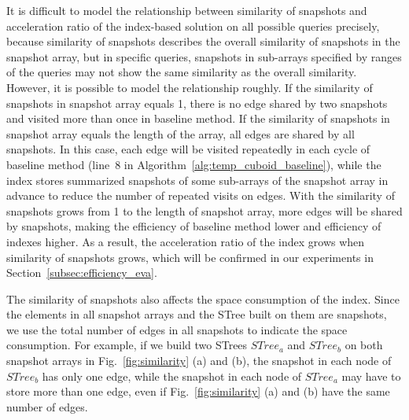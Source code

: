 \documentclass[10pt,journal,compsoc]{IEEEtran}
\begin{document}
It is difficult to model the relationship between similarity of snapshots and acceleration ratio of the index-based solution on all possible queries precisely, because similarity of snapshots describes the overall similarity of snapshots in the snapshot array, but in specific queries, snapshots in sub-arrays specified by ranges of the queries may not show the same similarity as the overall similarity. However, it is possible to model the relationship roughly. If the similarity of snapshots in snapshot array equals 1, there is no edge shared by two snapshots and visited more than once in baseline method. If the similarity of snapshots in snapshot array equals the length of the array, all edges are shared by all snapshots. In this case, each edge will be visited repeatedly in each cycle of baseline method (line~8 in Algorithm~\ref{alg:temp_cuboid_baseline}), while the index stores summarized snapshots of some sub-arrays of the snapshot array in advance to reduce the number of repeated visits on edges. With the similarity of snapshots grows from 1 to the length of snapshot array, more edges will be shared by snapshots, making the efficiency of baseline method lower and efficiency of indexes higher. As a result, the acceleration ratio of the index grows when similarity of snapshots grows, which will be confirmed in our experiments in Section~\ref{subsec:efficiency_eva}.

The similarity of snapshots also affects the space consumption of the index. Since the elements in all snapshot arrays and the STree built on them are snapshots, we use the total number of edges in all snapshots to indicate the space consumption. For example, if we build two STrees $ STree_a $ and $ STree_b $ on both snapshot arrays in Fig.~\ref{fig:similarity} (a) and (b), the snapshot in each node of $ STree_b $ has only one edge, while the snapshot in each node of $ STree_a $ may have to store more than one edge, even if Fig.~\ref{fig:similarity} (a) and (b) have the same number of edges.
\end{document}
